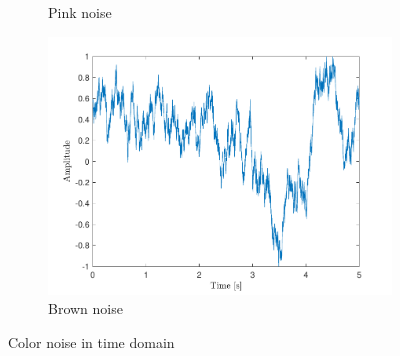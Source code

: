 \documentclass[10pt]{article}
\begin{document}
\begin{figure}[ht]
\begin{subfigure}[b]{0.31\textwidth}
        \caption{Pink noise}
    \end{subfigure}
    \quad
    \begin{subfigure}[b]{0.31\textwidth}
        \includegraphics[width=\textwidth]{problem11_brown_noise_time.pdf}
        \caption{Brown noise}
    \end{subfigure}
    \caption{Color noise in time domain\vspace{-0.5cm}}
    \label{color_noise_time_domain}
\end{figure}
\end{document}
